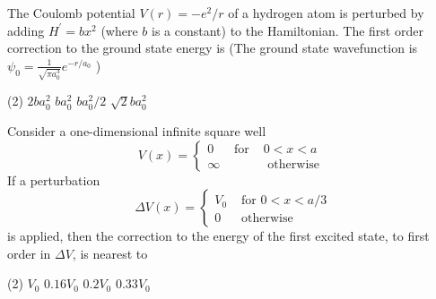 \begin{enumerate}
\begin{minipage}{\textwidth}
	\item The Coulomb potential $V(r)=-e^{2} / r$ of a hydrogen atom is perturbed by adding $H^{\prime}=b x^{2}$ (where $b$ is a constant) to the Hamiltonian. The first order correction to the ground state energy is
	(The ground state wavefunction is $\psi_{0}=\frac{1}{\sqrt{\pi a_{0}^{3}}} e^{-r / a_{0}}$ )
\end{minipage}
\begin{tasks}(2)
	\task[\textbf{A.}] $2 b a_{0}^{2}$
	\task[\textbf{B.}]$b a_{0}^{2}$
	\task[\textbf{C.}]$b a_{0}^{2} / 2$
	\task[\textbf{D.}]$\sqrt{2} b a_{0}^{2}$
\end{tasks}
\begin{minipage}{\textwidth}
	\item Consider a one-dimensional infinite square well
	$$
	V(x)=\left\{\begin{array}{lll}
	0 & \text { for } & 0<x<a \\
	\infty & & \text { otherwise }
	\end{array}\right.
	$$
	If a perturbation
	$$
	\Delta V(x)=\left\{\begin{array}{lc}
	V_{0} & \text { for } 0<x<a / 3 \\
	0 & \text { otherwise }
	\end{array}\right.
	$$
	is applied, then the correction to the energy of the first excited state, to first order in $\Delta V$, is nearest to
\end{minipage}
\begin{tasks}(2)
	\task[\textbf{A.}] $V_{0}$
	\task[\textbf{B.}]$0.16 V_{0}$
	\task[\textbf{C.}]$0.2 V_{0}$
	\task[\textbf{D.}]$0.33 V_{0}$
\end{tasks}
 \end{enumerate}
 

